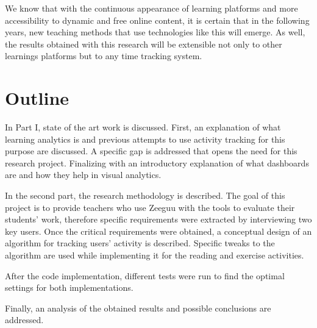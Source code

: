 We know that with the continuous appearance of learning platforms and more accessibility to dynamic and free online content, it is certain that in the following years, new teaching methods that use technologies like this will emerge. As well, the results obtained with this research will be extensible not only to other learnings platforms but to any time tracking system.


\section{Outline}

In Part I, state of the art work is discussed. First, an explanation of what learning analytics is and previous attempts to use activity tracking for this purpose are discussed. A specific gap is addressed that opens the need for this research project. Finalizing with an introductory explanation of what dashboards are and how they help in visual analytics.

In the second part, the research methodology is described. The goal of this project is to provide teachers who use Zeeguu with the tools to evaluate their students' work, therefore specific requirements were extracted by interviewing two key users. Once the critical requirements were obtained, a conceptual design of an algorithm for tracking users' activity is described. Specific tweaks to the algorithm are used while implementing it for the reading and exercise activities.

After the code implementation, different tests were run to find the optimal settings for both implementations.

Finally, an analysis of the obtained results and possible conclusions are addressed.


